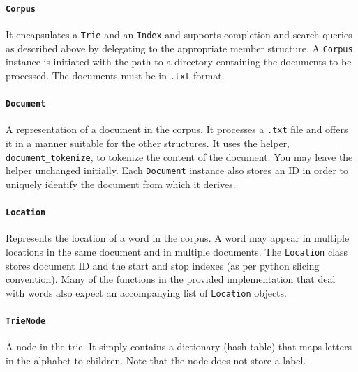 \documentclass[addpoints]{exam}
\begin{document}
\paragraph{\texttt{Corpus}} It encapsulates a \texttt{Trie} and an \texttt{Index} and supports completion and search queries as described above by delegating to the appropriate member structure. A \texttt{Corpus} instance is initiated with the path to a directory containing the documents to be processed. The documents must be in \texttt{.txt} format.

\paragraph{\texttt{Document}} A representation of a document in the corpus. It processes a \texttt{.txt} file and offers it in a manner suitable for the other structures. It uses the helper, \texttt{document\_tokenize}, to tokenize the content of the document. You may leave the helper unchanged initially. Each \texttt{Document} instance also stores an ID in order to uniquely identify the document from which it derives.

\paragraph{\texttt{Location}} Represents the location of a word in the corpus. A word may appear in multiple locations in the same document and in multiple documents. The \texttt{Location} class stores document ID and the start and stop indexes (as per python slicing convention). Many of the functions in the provided implementation that deal with words also expect an accompanying list of \texttt{Location} objects.

\paragraph{\texttt{TrieNode}} A node in the trie. It simply contains a dictionary (hash table) that maps letters in the alphabet to children. Note that the node does not store a label.
\end{document}
